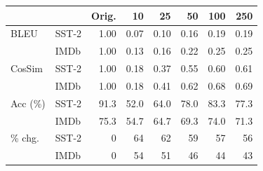 \begin{tabular}{llrrrrrr}
\toprule
 & & Orig. & 10 & 25 & 50 & 100 & 250 \\
\midrule
BLEU & SST-2 & 1.00 & 0.07 & 0.10 & 0.16 & 0.19 & 0.19 \\
 & IMDb & 1.00 & 0.13 & 0.16 & 0.22 & 0.25 & 0.25 \\
CosSim & SST-2 & 1.00 & 0.18 & 0.37 & 0.55 & 0.60 & 0.61 \\
 & IMDb & 1.00 & 0.18 & 0.41 & 0.62 & 0.68 & 0.69 \\
Acc (\%) & SST-2 & 91.3 & 52.0 & 64.0 & 78.0 & 83.3 & 77.3 \\
 & IMDb & 75.3 & 54.7 & 64.7 & 69.3 & 74.0 & 71.3 \\
\% chg. & SST-2 & 0 & 64 & 62 & 59 & 57 & 56 \\
 & IMDb & 0 & 54 & 51 & 46 & 44 & 43 \\
\bottomrule
\end{tabular}
